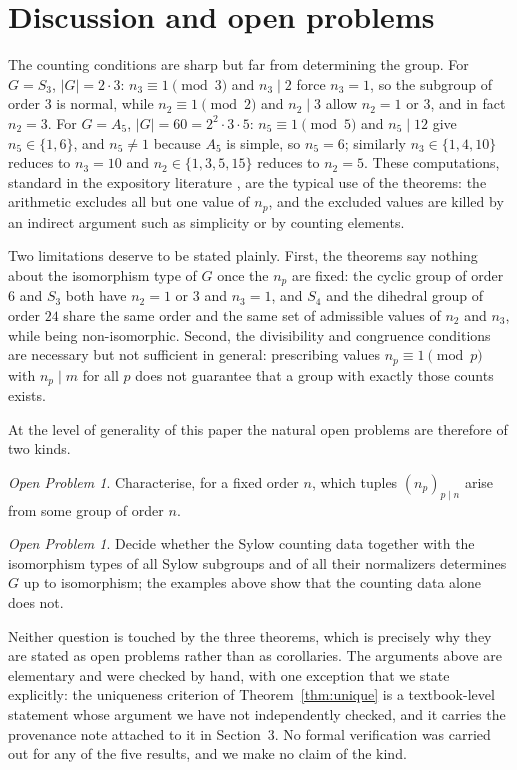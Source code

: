 \documentclass[11pt]{article}
\theoremstyle{definition}
\theoremstyle{remark}
\newtheorem{openproblem}[theorem]{Open Problem}
\begin{document}
\section{Discussion and open problems}

The counting conditions are sharp but far from determining the group. For $G=S_3$, $|G|=2\cdot 3$: $n_3\equiv 1\pmod 3$ and $n_3\mid 2$ force $n_3=1$, so the subgroup of order $3$ is normal, while $n_2\equiv 1\pmod 2$ and $n_2\mid 3$ allow $n_2=1$ or $3$, and in fact $n_2=3$. For $G=A_5$, $|G|=60=2^{2}\cdot 3\cdot 5$: $n_5\equiv 1\pmod 5$ and $n_5\mid 12$ give $n_5\in\{1,6\}$, and $n_5\neq 1$ because $A_5$ is simple, so $n_5=6$; similarly $n_3\in\{1,4,10\}$ reduces to $n_3=10$ and $n_2\in\{1,3,5,15\}$ reduces to $n_2=5$. These computations, standard in the expository literature \cite{conrad,harris,idelhaj,vakil}, are the typical use of the theorems: the arithmetic excludes all but one value of $n_p$, and the excluded values are killed by an indirect argument such as simplicity or by counting elements.

Two limitations deserve to be stated plainly. First, the theorems say nothing about the isomorphism type of $G$ once the $n_p$ are fixed: the cyclic group of order $6$ and $S_3$ both have $n_2=1$ or $3$ and $n_3=1$, and $S_4$ and the dihedral group of order $24$ share the same order and the same set of admissible values of $n_2$ and $n_3$, while being non-isomorphic. Second, the divisibility and congruence conditions are necessary but not sufficient in general: prescribing values $n_p\equiv 1\pmod p$ with $n_p\mid m$ for all $p$ does not guarantee that a group with exactly those counts exists.

At the level of generality of this paper the natural open problems are therefore of two kinds. \begin{openproblem}Characterise, for a fixed order $n$, which tuples $(n_p)_{p\mid n}$ arise from some group of order $n$.\end{openproblem} \begin{openproblem}Decide whether the Sylow counting data together with the isomorphism types of all Sylow subgroups and of all their normalizers determines $G$ up to isomorphism; the examples above show that the counting data alone does not.\end{openproblem} Neither question is touched by the three theorems, which is precisely why they are stated as open problems rather than as corollaries. The arguments above are elementary and were checked by hand, with one exception that we state explicitly: the uniqueness criterion of Theorem~\ref{thm:unique} is a textbook-level statement whose argument we have not independently checked, and it carries the provenance note attached to it in Section~3. No formal verification was carried out for any of the five results, and we make no claim of the kind.
\end{document}

